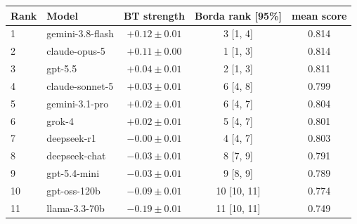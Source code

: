 \begin{tabular}{llccc}
\toprule
Rank & Model & BT strength & Borda rank [95\%] & mean score \\
\midrule
1 & gemini-3.8-flash & $+0.12 \pm 0.01$ & 3 [1, 4] & 0.814 \\
2 & claude-opus-5 & $+0.11 \pm 0.00$ & 1 [1, 3] & 0.814 \\
3 & gpt-5.5 & $+0.04 \pm 0.01$ & 2 [1, 3] & 0.811 \\
4 & claude-sonnet-5 & $+0.03 \pm 0.01$ & 6 [4, 8] & 0.799 \\
5 & gemini-3.1-pro & $+0.02 \pm 0.01$ & 6 [4, 7] & 0.804 \\
6 & grok-4 & $+0.02 \pm 0.01$ & 5 [4, 7] & 0.801 \\
7 & deepseek-r1 & $-0.00 \pm 0.01$ & 4 [4, 7] & 0.803 \\
8 & deepseek-chat & $-0.03 \pm 0.01$ & 8 [7, 9] & 0.791 \\
9 & gpt-5.4-mini & $-0.03 \pm 0.01$ & 9 [8, 9] & 0.789 \\
10 & gpt-oss-120b & $-0.09 \pm 0.01$ & 10 [10, 11] & 0.774 \\
11 & llama-3.3-70b & $-0.19 \pm 0.01$ & 11 [10, 11] & 0.749 \\
\bottomrule
\end{tabular}
